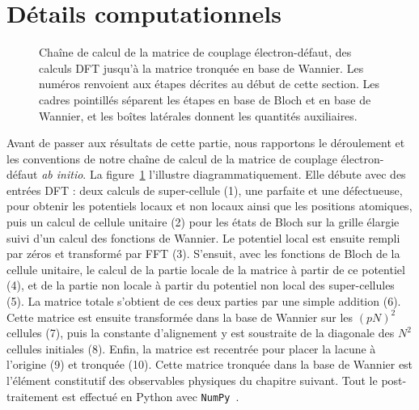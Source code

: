 \section{Détails computationnels}\label{sec:M_détails}
\vspace*{\fill}
\begin{figure}[htbp]
    \centering
    \hspace{2.5cm}
    
    \caption[Représentation schématique de la chaîne de calcul pour la matrice de couplage électron-défaut.]{Chaîne de calcul de la matrice de couplage électron-défaut, des calculs DFT jusqu'à la matrice tronquée en base de Wannier. Les numéros renvoient aux étapes décrites au début de cette section. Les cadres pointillés séparent les étapes en base de Bloch et en base de Wannier, et les boîtes latérales donnent les quantités auxiliaires.}
    \label{fig:chaine_M}
\end{figure}
\vspace*{\fill}
Avant de passer aux résultats de cette partie, nous rapportons le déroulement et les conventions de notre chaîne de calcul de la matrice de couplage électron-défaut \textit{ab initio}. La figure~\ref{fig:chaine_M} l'illustre diagrammatiquement. Elle débute avec des entrées DFT : deux calculs de super-cellule (1), une parfaite et une défectueuse, pour obtenir les potentiels locaux et non locaux ainsi que les positions atomiques, puis un calcul de cellule unitaire (2) pour les états de Bloch sur la grille élargie suivi d'un calcul des fonctions de Wannier. Le potentiel local est ensuite rempli par zéros et transformé par FFT (3). S'ensuit, avec les fonctions de Bloch de la cellule unitaire, le calcul de la partie locale de la matrice à partir de ce potentiel (4), et de la partie non locale à partir du potentiel non local des super-cellules (5). La matrice totale s'obtient de ces deux parties par une simple addition (6). Cette matrice est ensuite transformée dans la base de Wannier sur les $(pN)^2$ cellules (7), puis la constante d'alignement y est soustraite de la diagonale des $N^2$ cellules initiales (8). Enfin, la matrice est recentrée pour placer la lacune à l'origine (9) et tronquée (10). Cette matrice tronquée dans la base de Wannier est l'élément constitutif des observables physiques du chapitre suivant. Tout le post-traitement est effectué en Python avec \texttt{NumPy}~\cite{harrisArrayProgrammingNumPy2020}.

\bigskip
{}

